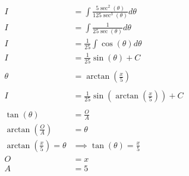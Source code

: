 \documentclass[12pt]{article}
\begin{document}
\begin{align}
    I                                                & = \int \frac{5\sec^2(\theta)}{125\sec^3(\theta)} d\theta                                 \\
    I                                                & = \int \frac{1}{25\sec(\theta)} d\theta                                                  \\
    I                                                & = \frac{1}{25} \int \cos(\theta) d\theta                                                 \\
    I                                                & = \frac{1}{25} \sin(\theta) + C                                                          \\
    \nonumber                                                                                                                                   \\
    \theta                                           & = \arctan\left(\frac{x}{5}\right)                                                        \\
    \nonumber                                                                                                                                   \\
    I                                                & = \frac{1}{25} \sin\left(\arctan\left(\frac{x}{5}\right)\right) + C                      \\
    \nonumber                                                                                                                                   \\
    \tan(\theta)                                     & = \frac{O}{A}                                                                            \\
    \arctan\left(\frac{O}{A}\right)                  & = \theta                                                                                 \\
    \arctan\left(\frac{x}{5}\right) = \theta         & \implies \tan(\theta) = \frac{x}{5}                                                      \\
    O                                                & = x                                                                                      \\
    A                                                & = 5                                                                                      \\

\end{align}
\end{document}
